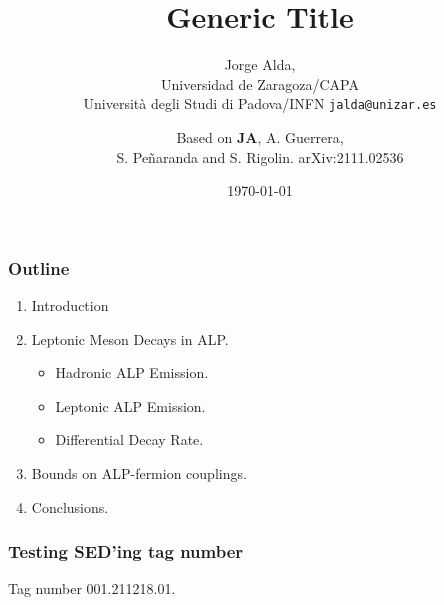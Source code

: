 \documentclass[mathserif, 10pt]{beamer}
\title{Generic Title}
\subtitle{Jorge Alda,\\ Universidad de Zaragoza/CAPA\\
Università degli Studi di Padova/INFN \hspace{4em} \texttt{jalda@unizar.es} }
\author[Jorge Alda]{Based on \textbf{JA}, A. Guerrera,\\ S. Peñaranda and S. Rigolin. \hspace{2em} arXiv:2111.02536}
\date[Conference]{\today}
\begin{document}
\begin{frame}

\titlepage

\end{frame}

\begin{frame}
\frametitle{Outline}
\begin{enumerate}
\item Introduction
\item Leptonic Meson Decays in ALP.
\begin{itemize}
\item Hadronic ALP Emission.
\item Leptonic ALP Emission.
\item Differential Decay Rate.
\end{itemize}
\item Bounds on ALP-fermion couplings.
\item Conclusions.
\end{enumerate}
\end{frame}

\begin{frame}
\frametitle{Testing SED'ing tag number}
Tag number 001.211218.01.
\end{frame}
\end{document}
